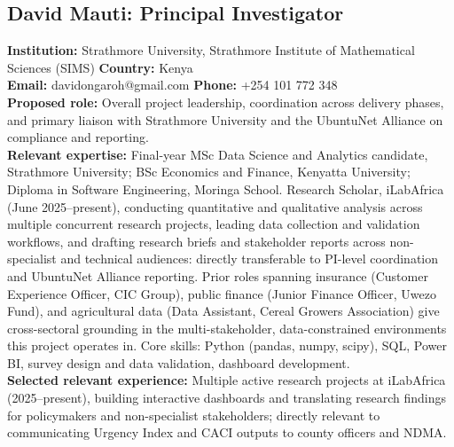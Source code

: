\documentclass[12pt,a4paper]{article}
\begin{document}
\subsection*{David Mauti: Principal Investigator}
\textbf{Institution:} Strathmore University, Strathmore Institute of Mathematical Sciences (SIMS) \quad \textbf{Country:} Kenya \\
\textbf{Email:} davidongaroh@gmail.com \quad \textbf{Phone:} +254 101 772 348 \\
\textbf{Proposed role:} Overall project leadership, coordination across delivery phases, and primary liaison with Strathmore University and the UbuntuNet Alliance on compliance and reporting. \\
\textbf{Relevant expertise:} Final-year MSc Data Science and Analytics candidate, Strathmore University; BSc Economics and Finance, Kenyatta University; Diploma in Software Engineering, Moringa School. Research Scholar, iLabAfrica (June 2025--present), conducting quantitative and qualitative analysis across multiple concurrent research projects, leading data collection and validation workflows, and drafting research briefs and stakeholder reports across non-specialist and technical audiences: directly transferable to PI-level coordination and UbuntuNet Alliance reporting. Prior roles spanning insurance (Customer Experience Officer, CIC Group), public finance (Junior Finance Officer, Uwezo Fund), and agricultural data (Data Assistant, Cereal Growers Association) give cross-sectoral grounding in the multi-stakeholder, data-constrained environments this project operates in. Core skills: Python (pandas, numpy, scipy), SQL, Power BI, survey design and data validation, dashboard development. \\
\textbf{Selected relevant experience:} Multiple active research projects at iLabAfrica (2025--present), building interactive dashboards and translating research findings for policymakers and non-specialist stakeholders; directly relevant to communicating Urgency Index and CACI outputs to county officers and NDMA.
\end{document}
